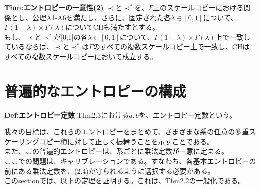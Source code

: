 \documentclass[a4paper,11pt]{jsarticle}
\begin{document}
\begin{itembox}[l]{\textbf{Thm:エントロピーの一意性(2)}}
    $\prec$と$\prec ^*$を、$\Gamma$上のスケールコピーにおける関係とし、公理A1-A6を満たし、さらに、固定された各$\lambda \in [0,1]$について、$\Gamma(1-\lambda)\times \Gamma(\lambda)$についてCHも満たすとする。\\
    もし、$\prec$と$\prec ^*$が[0,1]の各$\lambda\in [0,1]$について、$\Gamma(1-\lambda)\times \Gamma(\lambda)$上で一致しているならば、$\prec$と$\prec ^*$は$\Gamma$のすべての複数スケールコピー上で一致し、CHはすべての複数スケールコピーにおいて成立する。
\end{itembox}

\section{普遍的なエントロピーの構成}
\begin{itembox}[l]{\textbf{Def:エントロピー定数}}
    Thm2.3における$a,b$を、エントロピー定数という。
\end{itembox}
我々の目標は、これらのエントロピーをまとめて、さまざまな系の任意の多重スケーリングコピー積に対して正しく振舞うことを示すことである。\\
また、この普遍的エントロピーは、系ごとに乗法定数が一意に定まる。\\
ここでの問題は、キャリブレーションである。すなわち、各基本エントロピーの前にある乗法定数を、(2.4)が守られるように選択する必要がある。\\
このsectionでは、以下の定理を証明する。これは、Thm2.2の一般化である。\\
\end{document}

